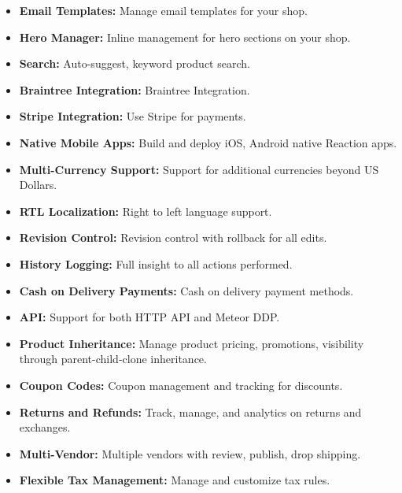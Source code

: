 \begin{itemize}
	\item \textbf{ Email Templates:} Manage email templates for your shop.
	
	\item \textbf{ Hero Manager:} Inline management for hero sections on your shop.
	
	\item \textbf{ Search:} Auto-suggest, keyword product search.
	
	\item \textbf{ Braintree Integration:} Braintree Integration.
	
	\item \textbf{ Stripe Integration:} Use Stripe for payments.
	
	\item \textbf{ Native Mobile Apps:} Build and deploy iOS, Android native Reaction apps.
	
	\item \textbf{ Multi-Currency Support:} Support for additional currencies beyond US Dollars.
	
	\item \textbf{ RTL Localization:} Right to left language support.
	
	\item \textbf{ Revision Control:} Revision control with rollback for all edits.
	
	\item \textbf{ History Logging:} Full insight to all actions performed.
	
	\item \textbf{ Cash on Delivery Payments:} Cash on delivery payment methods.
	
	\item \textbf{ API:} Support for both HTTP API and Meteor DDP.
	
	\item \textbf{ Product Inheritance:} Manage product pricing, promotions, visibility through parent-child-clone inheritance.
	
	\item \textbf{ Coupon Codes:} Coupon management and tracking for discounts.
	
	\item \textbf{ Returns and Refunds:} Track, manage, and analytics on returns and exchanges.
	
	\item \textbf{ Multi-Vendor:} Multiple vendors with review, publish, drop shipping.
	
	\item \textbf{ Flexible Tax Management:} Manage and customize tax rules.
	

\end{itemize}
